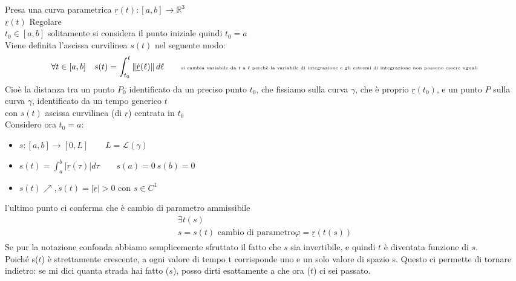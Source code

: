 \documentclass[a4paper, oneside]{article}
\begin{document}
\begin{definition}
    Presa una curva parametrica $\underline{r}(t):[a,b] \to \mathbb{R}^3$\\
     $\underline{r}(t)$ Regolare\\
     $t_0 \in [a,b]$ \tiny solitamente si considera il punto iniziale quindi $t_0 = a$\normalsize \\
    Viene definita l'ascissa curvilinea $s(t)$ nel seguente modo:\\ 
    \begin{gather*}
        \forall t \in [a,b] \quad s(t) = \int_{t_0}^{t}  \left\lVert \underline{\dot{r}}(\ell)\right\rVert  d\ell \qquad \text{\tiny si cambia variabile da $t$ a $\ell$ perchè la variabile di integrazione e gli estremi di integrazione non possono essere uguali\normalsize}
    \end{gather*}
    Cioè la distanza tra un punto $P_0$ identificato da un preciso punto $t_0$, che fissiamo sulla curva $\gamma$, che è proprio $\underline{r}(t_0)$, e un punto $P$ sulla curva $\gamma$, identificato da un tempo generico $t$ \\
    con $s(t)$ ascissa curvilinea (di $\underline{r}$) centrata in $t_0$ \\
    Considero ora $t_0 = a$:
    \begin{itemize}
        \item $s:[a,b] \to [0,L] \qquad L = \mathcal{L}(\gamma)$
        \item $s(t) = \int_{a}^{b} | \underline{\dot{r}} (\tau)| d\tau \qquad s(a) = 0 \ s(b) = 0$
        \item $s(t) \nearrow , \dot{s}(t) = | \underline{\dot{r}} |> 0$ con $s \in C^1 $
    \end{itemize}
    l'ultimo punto ci conferma che è cambio di parametro ammissibile
\begin{gather*}
    \exists t(s)\\
    s= s(t) \text{ cambio di parametro}
    \boxed{\underline{\varphi} = \underline{r}(t(s))}
\end{gather*}
Se pur la notazione confonda abbiamo semplicemente sfruttato il fatto che $s$ sia invertibile, e quindi $t$ è diventata funzione di $s$.\\
Poiché s($t$) è strettamente crescente, a ogni valore di tempo t corrisponde uno e un solo valore di spazio s. Questo ci permette di tornare indietro: se mi dici quanta strada hai fatto ($s$), posso dirti esattamente a che ora ($t$) ci sei passato.
\end{definition}
\hfill\\
\end{document}
